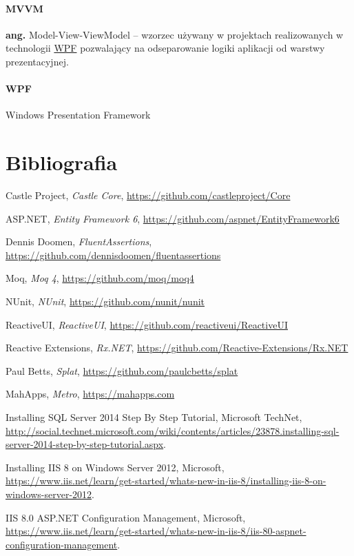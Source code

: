 \documentclass[10pt,a4paper]{article}
\begin{document}
\label{abbr:mvvm}
\paragraph{MVVM} \textbf{ang.} Model-View-ViewModel -- wzorzec używany w projektach realizowanych w technologii \hyperref[abbr:wpf]{WPF} pozwalający na odseparowanie logiki aplikacji od warstwy prezentacyjnej. 

\label{abbr:wpf}
\paragraph{WPF} Windows Presentation Framework

\renewcommand*{\refname}{\vspace*{-2em}}
\section{Bibliografia}
\begin{thebibliography}{99}

	Castle Project,
	\emph{Castle Core},
	\url{https://github.com/castleproject/Core}

	ASP.NET,
	\emph{Entity Framework 6},
	\url{https://github.com/aspnet/EntityFramework6}

	Dennis Doomen,
	\emph{FluentAssertions},
	\url{https://github.com/dennisdoomen/fluentassertions}

	Moq,
	\emph{Moq 4},
	\url{https://github.com/moq/moq4}

	NUnit,
	\emph{NUnit},
	\url{https://github.com/nunit/nunit}

	ReactiveUI,
	\emph{ReactiveUI},
	\url{https://github.com/reactiveui/ReactiveUI}

	Reactive Extensions,
	\emph{Rx.NET},
	\url{https://github.com/Reactive-Extensions/Rx.NET}

	Paul Betts,
	\emph{Splat},
	\url{https://github.com/paulcbetts/splat}

	MahApps,
	\emph{Metro},
	\url{https://mahapps.com}

	Installing SQL Server 2014 Step By Step Tutorial,
	Microsoft TechNet,
	\url{http://social.technet.microsoft.com/wiki/contents/articles/23878.installing-sql-server-2014-step-by-step-tutorial.aspx}.

	Installing IIS 8 on Windows Server 2012,
	Microsoft,
	\url{https://www.iis.net/learn/get-started/whats-new-in-iis-8/installing-iis-8-on-windows-server-2012}.

	IIS 8.0 ASP.NET Configuration Management,
	Microsoft,
	\url{https://www.iis.net/learn/get-started/whats-new-in-iis-8/iis-80-aspnet-configuration-management}.

\end{thebibliography}
\end{document}
